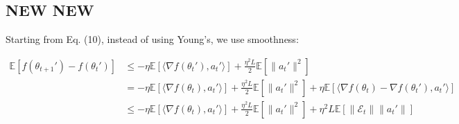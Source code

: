 \documentclass[11pt]{article}
\begin{document}
\subsection{NEW NEW}

Starting from Eq. (10), instead of using Young's, we use smoothness:

\begin{align}
    \mathbb E[f(\theta_{t+1}')-f(\theta_t')]&\leq -\eta\mathbb E[\langle \nabla f(\theta_t'), a_t'\rangle]+\frac{\eta^2L}{2}\mathbb E[\|a_t'\|^2]\\
    &=-\eta\mathbb E[\langle \nabla f(\theta_t), a_t'\rangle]+\frac{\eta^2L}{2}\mathbb E[\|a_t'\|^2]+\eta\mathbb E[\langle \nabla f(\theta_t)-\nabla f(\theta_t'),a_t'\rangle]\\
    &\leq -\eta\mathbb E[\langle \nabla f(\theta_t), a_t'\rangle]+\frac{\eta^2L}{2}\mathbb E[\|a_t'\|^2]+\eta^2 L\mathbb E[\| \mathcal E_t\| \|a_t'\|] \label{eq0}
\end{align}
\end{document}
